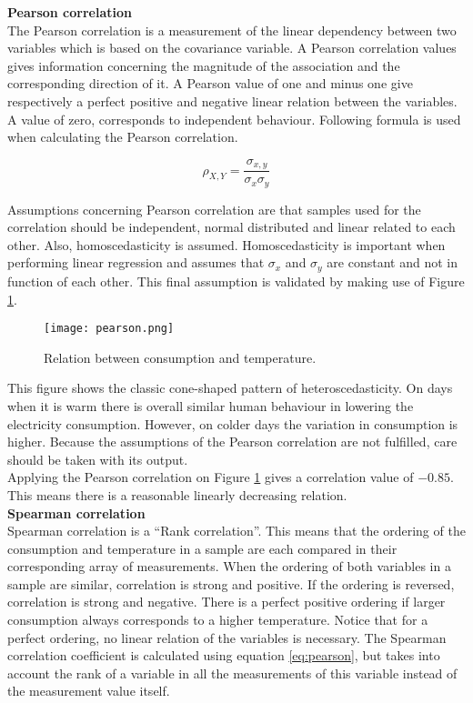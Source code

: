 \textbf{Pearson correlation}\\
The Pearson correlation is a measurement of the linear dependency between two variables which is based on the covariance variable. A Pearson correlation values gives information concerning the magnitude of the association and the corresponding direction of it. A Pearson value of one and minus one give respectively a perfect positive and negative linear relation between the variables. A value of zero, corresponds to independent behaviour. Following formula is used when calculating the Pearson correlation. 

\begin{equation}\label{eq:pearson}
	\rho_{X,Y} = \frac{\sigma_{x,y}}{\sigma_x\sigma_y}
\end{equation}

Assumptions concerning Pearson correlation are that samples used for the correlation should be independent, normal distributed and linear related to each other. Also, homoscedasticity is assumed. Homoscedasticity is important when performing linear regression and assumes that $ \sigma_x $ and $ \sigma_y $ are constant and not in function of each other. This final assumption is validated by making use of Figure \ref{fig:pearson}.

\begin{figure}[h!]
	\centering
	\texttt{[image: pearson.png]}
	\caption{Relation between consumption and temperature.}
	\label{fig:pearson}
\end{figure}

This figure shows the classic cone-shaped pattern of heteroscedasticity. On days when it is warm there is overall similar human behaviour in lowering the electricity consumption. However, on colder days the variation in consumption is higher. Because the assumptions of the Pearson correlation are not fulfilled, care should be taken with its output.\\

Applying the Pearson correlation on Figure \ref{fig:pearson} gives a correlation value of $ -0.85 $. This means there is a reasonable linearly decreasing relation.\\


\textbf{Spearman correlation}\\
Spearman correlation is a ``Rank correlation''. This means that the ordering of the consumption and temperature in a sample are each compared in their corresponding array of measurements.  When the ordering of both variables in a sample are similar, correlation is strong and positive. If the ordering is reversed, correlation is strong and negative. There is a perfect positive ordering if larger consumption always corresponds to a higher temperature. Notice that for a perfect ordering, no linear relation of the variables is necessary. The Spearman correlation coefficient is calculated using equation \ref{eq:pearson}, but takes into account the rank of a variable in all the measurements of this variable instead of the measurement value itself.\\

